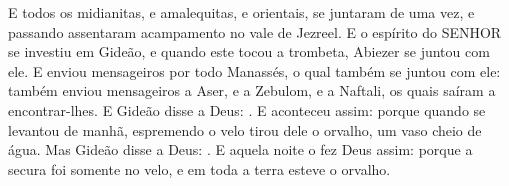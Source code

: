 {  E todos os midianitas, e amalequitas, e orientais, se juntaram de uma vez, e passando assentaram acampamento no vale de Jezreel.
  E o espírito do SENHOR se investiu em Gideão, e quando este tocou a trombeta, Abiezer se juntou com ele. %
  E enviou mensageiros por todo Manassés, o qual também se juntou com ele: também enviou mensageiros a Aser, e a Zebulom, e a Naftali, os quais saíram a encontrar-lhes.
  E Gideão disse a Deus: . %
  E aconteceu assim: porque quando se levantou de manhã, espremendo o velo tirou dele o orvalho, um vaso cheio de água.
  Mas Gideão disse a Deus: .
  E aquela noite o fez Deus assim: porque a secura foi somente no velo, e em toda a terra esteve o orvalho.
\par }

